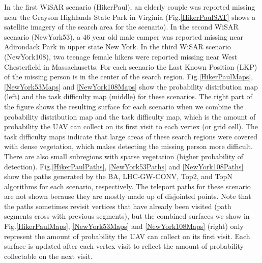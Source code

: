 In the first WiSAR scenario (HikerPaul), an elderly couple was reported missing near the Grayson Highlands State Park in Virginia (Fig.\ref{HikerPaulSAT} shows a satellite imagery of the search area for the scenario). In the second WiSAR scenario (NewYork53), a 46 year old male camper was reported missing near Adirondack Park in upper state New York. In the third WiSAR scenario (NewYork108), two teenage female hikers were reported missing near West Chesterfield in Massachusetts. For each scenario the Last Known Position (LKP) of the missing person is in the center of the search region. Fig.\ref{HikerPaulMaps}, \ref{NewYork53Maps} and \ref{NewYork108Maps} show the probability distribution map (left) and the task difficulty map (middle) for these scenarios. The right part of the figure shows the resulting surface for each scenario when we combine the probability distribution map and the task difficulty map, which is the amount of probability the UAV can collect on its first visit to each vertex (or grid cell). The task difficulty maps indicate that large areas of these search regions were covered with dense vegetation, which makes detecting the missing person more difficult. There are also small subregions with sparse vegetation (higher probability of detection). Fig.\ref{HikerPaulPaths}, \ref{NewYork53Paths} and \ref{NewYork108Paths} show the paths generated by the BA, LHC-GW-CONV, Top2, and TopN algorithms for each scenario, respectively. The teleport paths for these scenario are not shown because they are mostly made up of disjointed points. Note that the paths sometimes revisit vertices that have already been visited (path segments cross with previous segments), but the combined surfaces we show in Fig.\ref{HikerPaulMaps}, \ref{NewYork53Maps} and \ref{NewYork108Maps} (right) only represent the amount of probability the UAV can collect on its first visit. Each surface is updated after each vertex visit to reflect the amount of probability collectable on the next visit.


